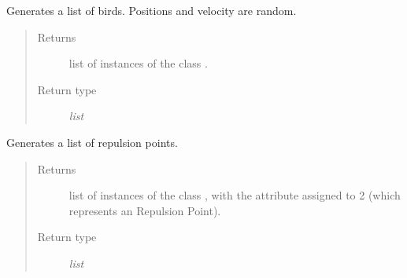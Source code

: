 \documentclass[a4paper,11pt,oneside,english]{sphinxmanual}
\begin{document}

\begin{fulllineitems}
\label{\detokenize{initialize_birds:initialize_birds.generateBirds}}
Generates a list of birds. Positions and velocity are random.
\begin{quote}\begin{description}
\item[{Returns}] \leavevmode
list of instances of the class {\hyperref[\detokenize{bird:bird.Bird}]{}}.

\item[{Return type}] \leavevmode
\textit{list}

\end{description}\end{quote}

\bigskip 
\bigskip 

\end{fulllineitems}


\begin{fulllineitems}
\label{\detokenize{initialize_birds:initialize_birds.generateRepulsionPoints}}
Generates a list of repulsion points.
\begin{quote}\begin{description}
\item[{Returns}] \leavevmode
list of instances of the class {\hyperref[\detokenize{bird:bird.Bird}]{}}, with the attribute  assigned to \sphinxhyphen{}2 (which represents an Repulsion Point).

\item[{Return type}] \leavevmode
\textit{list}

\end{description}\end{quote}

\bigskip 
\bigskip 

\end{fulllineitems}
\end{document}
